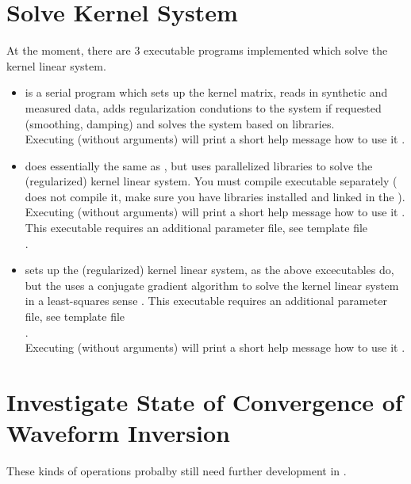 \section{Solve Kernel System} \label{basic_steps,sec:solve_kernel_system}
%
At the moment, there are 3 executable programs implemented which solve the kernel linear system.
\begin{itemize}
\item
{} is a serial program which sets up the kernel matrix, 
reads in synthetic and measured data, adds regularization condutions to the system if 
requested (smoothing, damping) and solves the system based on  libraries.\\
Executing  (without arguments) will print a short help message how to use it 
.
\item 
{} does essentially the same as , but uses
parallelized  libraries to solve the (regularized) kernel linear system. You
must compile executable  separately ( does not
compile it, make sure you have  libraries installed and linked in the 
).
Executing  (without arguments) will print a short help message how to use it 
.
This executable requires an additional parameter file, see template file\\
.
\item 
{} sets up the (regularized) kernel linear system, as the above
excecutables do, but the uses a conjugate gradient algorithm to solve the kernel linear system
in a least-squares sense .
This executable requires an additional parameter file, see template file\\
.\\
Executing  (without arguments) will print a short help message how to use it 
.
\end{itemize}
%
\section{Investigate State of Convergence of Waveform Inversion} \label{basic_steps,sec:investigate_convergence}
%
These kinds of operations probalby still need further development in \ASKI{}. 

